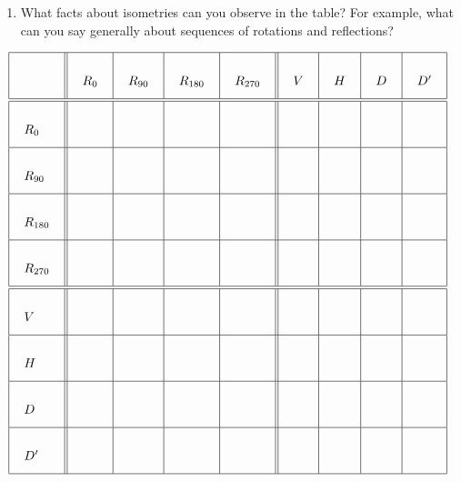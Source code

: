 \documentclass[handout,noauthor,nooutcomes]{ximera}
\begin{document}
\begin{problem}
\begin{enumerate}
\item What facts about isometries can you observe in the table?  For example, what can you say generally about sequences of rotations and reflections?  
\end{enumerate}
\[
{\arraycolsep=12pt\def\arraystretch{3}
\begin{array}{|l||l|l|l|l||l|l|l|l|}
\hline
 & R_0 & R_{90} & R_{180} & R_{270} & V & H & D & D' \\ \hline\hline
R_0 & & & & & & & & \\ \hline
R_{90} & & & & & & & & \\ \hline
R_{180} & & & & & & & & \\ \hline
R_{270} & & & & & & & & \\ \hline\hline
V & & & & & & & & \\ \hline
H & & & & & & & & \\ \hline
D & & & & & & & & \\ \hline
D' & & & & & & & & \\ \hline
\end{array}
}\]
\end{problem}

\end{document}
